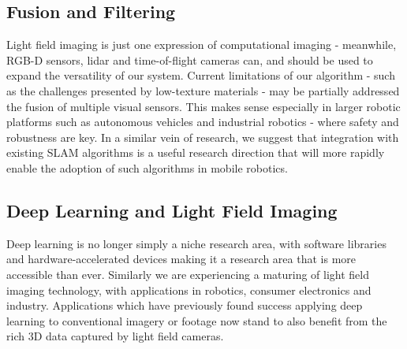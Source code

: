 \subsection{Fusion and Filtering}
Light field imaging is just one expression of computational imaging - meanwhile, RGB-D sensors, lidar and time-of-flight cameras can, and should be used to expand the versatility of our system. Current limitations of our algorithm - such as the challenges presented by low-texture materials - may be partially addressed the fusion of multiple visual sensors. This makes sense especially in larger robotic platforms such as autonomous vehicles and industrial robotics - where safety and robustness are key. In a similar vein of research, we suggest that integration with existing SLAM algorithms is a useful research direction that will more rapidly enable the adoption of such algorithms in mobile robotics.

\subsection{Deep Learning and Light Field Imaging}
Deep learning is no longer simply a niche research area, with software libraries and hardware-accelerated devices making it a research area that is more accessible than ever. Similarly we are experiencing a maturing of light field imaging technology, with applications in robotics, consumer electronics and industry. Applications which have previously found success applying deep learning to conventional imagery or footage now stand to also benefit from the rich 3D data captured by light field cameras. 